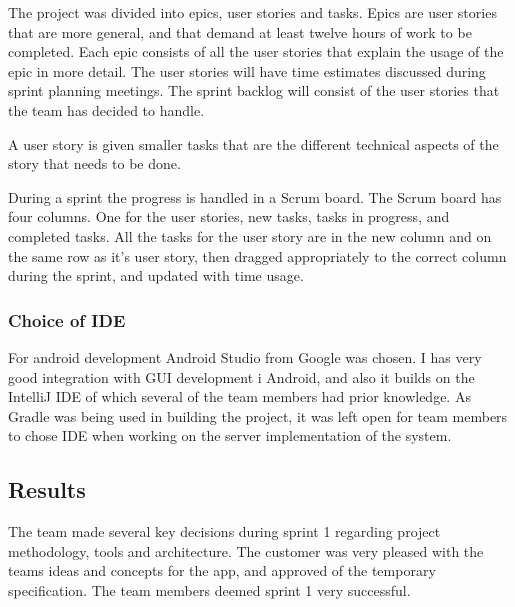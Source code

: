 The project was divided into epics, user stories and tasks. Epics are user stories that are more general, and that demand at least twelve hours of work to be completed. Each epic consists of all the user stories that explain the usage of the epic in more detail.
The user stories will have time estimates discussed during sprint planning meetings.
The sprint backlog will consist of the user stories that the team has decided to handle.

A user story is given smaller tasks that are the different technical aspects of the story that needs to be done.

During a sprint the progress is handled in a Scrum board. The Scrum board has four columns. One for the user stories, new tasks, tasks in progress, and completed tasks.
All the tasks for the user story are in the new column and on the same row as it's user story, then dragged appropriately to the correct column during the sprint, and updated with time usage.

\subsubsection{Choice of IDE}
For android development Android Studio from Google was chosen. I has very good integration with GUI development i Android, and also it builds on the IntelliJ IDE of which several of the team members had prior knowledge. As Gradle was being used in building the project, it was left open for team members to chose IDE when working on the server implementation of the system.

\subsection{Results}
The team made several key decisions during sprint 1 regarding project methodology, tools and architecture. The customer was very pleased with the teams ideas and concepts for the app, and approved of the temporary specification. The team members deemed sprint 1 very successful.